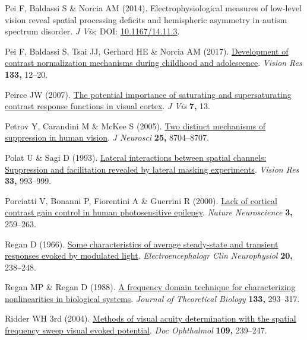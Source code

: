 \documentclass[
  letterpaper,
  DIV=11,
  numbers=noendperiod]{scrartcl}
\newlength{\cslhangindent}
\newenvironment{CSLReferences}[2] %
 {\begin{list}{}{%
  \setlength{\itemindent}{0pt}
  \setlength{\leftmargin}{0pt}
  \setlength{\parsep}{0pt}
  \ifodd #1
   \setlength{\leftmargin}{\cslhangindent}
   \setlength{\itemindent}{-1\cslhangindent}
  \fi
  \setlength{\itemsep}{#2\baselineskip}}}
 {\end{list}}
\begin{document}
\begin{CSLReferences}{1}{1}
Pei F, Baldassi S \& Norcia AM (2014). Electrophysiological measures of
low-level vision reveal spatial processing deficits and hemispheric
asymmetry in autism spectrum disorder. \emph{J Vis}; DOI:
\href{https://doi.org/10.1167/14.11.3}{10.1167/14.11.3}.

Pei F, Baldassi S, Tsai JJ, Gerhard HE \& Norcia AM (2017).
\href{https://doi.org/10.1016/j.visres.2016.03.010}{Development of
contrast normalization mechanisms during childhood and adolescence}.
\emph{Vision Res} \textbf{133,} 12--20.

Peirce JW (2007). \href{https://doi.org/10.1167/7.6.13}{The potential
importance of saturating and supersaturating contrast response functions
in visual cortex}. \emph{J Vis} \textbf{7,} 13.

Petrov Y, Carandini M \& McKee S (2005).
\href{https://doi.org/10.1523/JNEUROSCI.2871-05.2005}{Two distinct
mechanisms of suppression in human vision}. \emph{J Neurosci}
\textbf{25,} 8704--8707.

Polat U \& Sagi D (1993).
\href{https://doi.org/10.1016/0042-6989(93)90081-7}{Lateral interactions
between spatial channels: Suppression and facilitation revealed by
lateral masking experiments}. \emph{Vision Res} \textbf{33,} 993--999.

Porciatti V, Bonanni P, Fiorentini A \& Guerrini R (2000).
\href{https://doi.org/10.1038/72972}{Lack of cortical contrast gain
control in human photosensitive epilepsy}. \emph{Nature Neuroscience}
\textbf{3,} 259--263.

Regan D (1966). \href{https://doi.org/10.1016/0013-4694(66)90088-5}{Some
characteristics of average steady-state and transient responses evoked
by modulated light}. \emph{Electroencephalogr Clin Neurophysiol}
\textbf{20,} 238--248.

Regan MP \& Regan D (1988).
\href{https://doi.org/10.1016/S0022-5193(88)80323-0}{A frequency domain
technique for characterizing nonlinearities in biological systems}.
\emph{Journal of Theoretical Biology} \textbf{133,} 293--317.

Ridder WH 3rd (2004).
\href{https://doi.org/10.1007/s10633-004-8053-7}{Methods of visual
acuity determination with the spatial frequency sweep visual evoked
potential}. \emph{Doc Ophthalmol} \textbf{109,} 239--247.


\end{CSLReferences}
\end{document}
